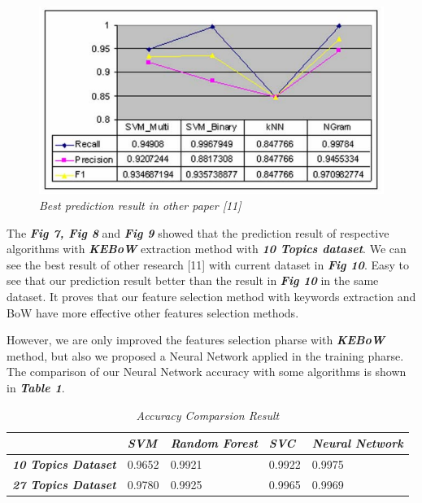 \documentclass[conference]{IEEEtran}
\begin{document}
\begin{figure}[h]
\includegraphics[scale=0.3]{level_1_other.png}
\centering
\caption{\textit{Best prediction result in other paper [11]}}
\end{figure}
The \textit{\textbf{Fig 7, Fig 8}} and \textit{\textbf{Fig 9}} showed that the prediction result of respective algorithms with \textbf{\textit{KEBoW}} extraction method with \textit{\textbf{10 Topics dataset}}. We can see the best result of other research [11] with current dataset in \textit{\textbf{Fig 10}}. Easy to see that our prediction result better than the result in \textit{\textbf{Fig 10}} in the same dataset. It proves that our feature selection method with keywords extraction and BoW have more effective other features selection methods.

However, we are only improved the features selection pharse with \textit{\textbf{KEBoW}} method, but also we proposed a Neural Network applied in the training pharse. The comparison of our Neural Network accuracy with some algorithms is shown in \textit{\textbf{Table 1}}.
\begin{table}[]
\centering
\caption{\textit{Accuracy Comparsion Result}}
\label{my-label}
\begin{tabular}{|l|l|l|l|l|}
\hline
                                                           & {\color[HTML]{333333} \textit{\textbf{SVM}}} & {\color[HTML]{333333} \textit{\textbf{Random Forest}}} & {\color[HTML]{333333} \textit{\textbf{SVC}}} & {\color[HTML]{333333} \textit{\textbf{Neural Network}}} \\ \hline
{\color[HTML]{333333} \textit{\textbf{10 Topics Dataset}}} & 0.9652                                       & 0.9921                                                 & 0.9922                                       & 0.9975                                                  \\ \hline
{\color[HTML]{333333} \textit{\textbf{27 Topics Dataset}}} & 0.9780                                       & 0.9925                                                 & 0.9965                                       & 0.9969                                                  \\ \hline
\end{tabular}
\end{table}
\end{document}
